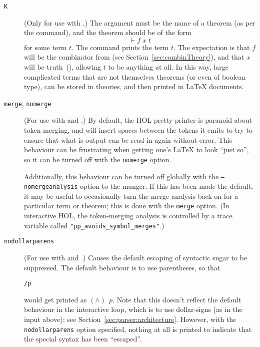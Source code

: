 \begin{description}
\item[\texttt{K}] (Only for use with \holtm.)
%
The argument must be the name of a theorem (as per the \holthm{} command), and the theorem should be of the form
\[
\vdash f\;x\;t
\]
for some term $t$.
%
The command prints the term $t$.
%
The expectation is that $f$ will be the combinator  from  (see Section~\ref{sec:combinTheory}), and that $x$ will be truth~(), allowing $t$ to be anything at all.
%
In this way, large complicated terms that are not themselves theorems (or even of boolean type), can be stored in \HOL{} theories, and then printed in \LaTeX{} documents.

\item[\texttt{merge}, \texttt{nomerge}] (For use with \holtm{} and \holthm.)
By default, the HOL pretty-printer is paranoid about token-merging, and will insert spaces between the tokens it emits to try to ensure that what is output can be read in again without error.
%
This behaviour can be frustrating when getting one's \LaTeX{} to look ``just so'', so it can be turned off with the \texttt{nomerge} option.

Additionally, this behaviour can be turned off globally with the \texttt{--nomergeanalysis} option to the munger.
%
If this has been made the default, it may be useful to occasionally turn the merge analysis back on for a particular term or theorem; this is done with the \texttt{merge} option.
%
(In interactive HOL, the token-merging analysis is controlled by a trace variable called \texttt{"pp\_avoids\_symbol\_merges"}.)


\item[\texttt{nodollarparens}] (For use with \holtm{} and \holthm.) Causes the default escaping of syntactic sugar to be suppressed.
%
The default behaviour is to use parentheses, so that
\begin{alltt}
   \holtm\lb\dol/\bs p\rb
\end{alltt}
would get printed as $(\land)\;\,p$.
Note that this doesn't reflect the default behaviour in the interactive loop, which is to use dollar-signs (as in the input above); see Section~\ref{sec:parser:architecture}.
However, with the \texttt{nodollarparens} option specified, nothing at all is printed to indicate that the special syntax has been ``escaped''.


\end{description}
